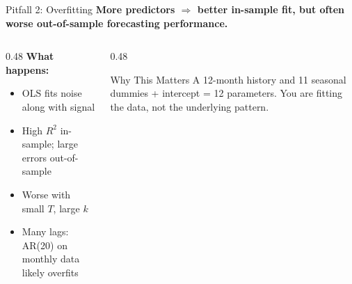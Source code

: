 \documentclass[aspectratio=169, 11pt]{beamer}
\begin{document}
\begin{frame}{Pitfall 2: Overfitting}
  \textbf{More predictors $\Rightarrow$ better in-sample fit, but often worse out-of-sample forecasting performance.}

  \vspace{0.1cm}
  \begin{columns}[T]
    \begin{column}{0.48\textwidth}
      \textbf{What happens:}
      \begin{itemize}
        \item OLS fits noise along with signal
        \item High $R^2$ in-sample; large errors out-of-sample
        \item Worse with small $T$, large $k$
        \item Many lags: AR(20) on monthly data
              likely overfits
      \end{itemize}
      \vspace{0.1cm}
    \end{column}
    \begin{column}{0.48\textwidth}
      \begin{examplebox}{Why This Matters}
        A 12-month history and 11 seasonal
        dummies + intercept = 12 parameters.
        You are fitting the data, not the
        underlying pattern.
        \smallskip

      \end{examplebox}
    \end{column}
  \end{columns}
\end{frame}
\end{document}
